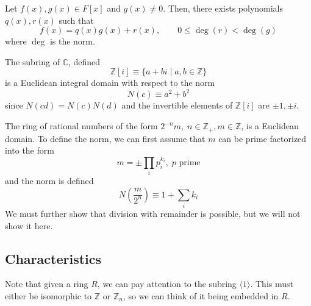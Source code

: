   \begin{theorem}
    Let $f(x), g(x) \in F[x]$ and $g(x) \neq 0$. Then, there exists polynomials $q(x), r(x)$ such that 
    \begin{equation}
      f(x) = q(x) g(x) + r(x), \qquad 0 \leq \deg(r) < \deg(g)
    \end{equation}
    where $\deg$ is the norm.
  \end{theorem}

  \begin{example}
    The subring of $\mathbb{C}$, defined
    \begin{equation}
      \mathbb{Z}[i] \equiv \{ a + b i \mid a, b \in \mathbb{Z} \}
    \end{equation}
    is a Euclidean integral domain with respect to the norm 
    \begin{equation}
      N(c) \equiv a^2 + b^2
    \end{equation}
    since $N(c d) = N(c) N(d)$ and the invertible elements of $\mathbb{Z}[i]$ are $\pm 1, \pm i$. 
  \end{example}

  \begin{example}
    The ring of rational numbers of the form $2^{-n} m, \; n \in \mathbb{Z}_+, m \in \mathbb{Z}$, is a Euclidean domain. To define the norm, we can first assume that $m$ can be prime factorized into the form 
    \begin{equation}
      m = \pm \prod_{i} p_{i}^{k_i}, \; p \text{ prime}
    \end{equation}
    and the norm is defined 
    \begin{equation}
      N(\frac{m}{2^n}) \equiv 1 + \sum_i k_i
    \end{equation}
    We must further show that division with remainder is possible, but we will not show it here. 
  \end{example}

\subsection{Characteristics}

  Note that given a ring $R$, we can pay attention to the subring $\langle 1 \rangle$. This must either be isomorphic to $\mathbb{Z}$ or $\mathbb{Z}_n$, so we can think of it being embedded in $R$. 
  
